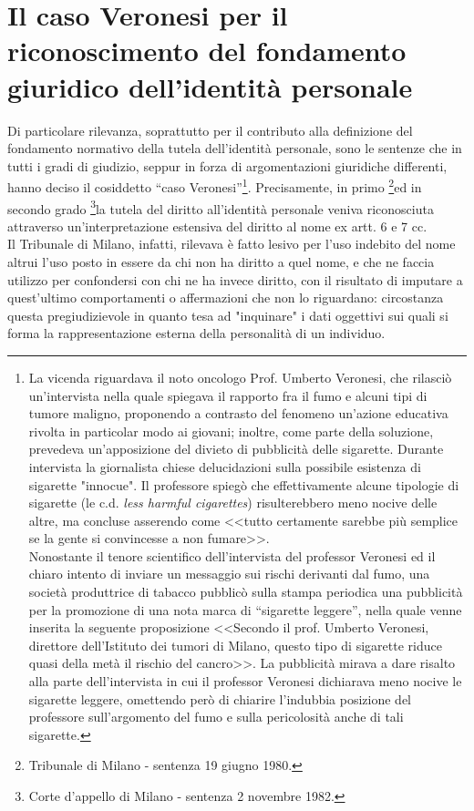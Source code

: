 \section{Il caso Veronesi per il riconoscimento del fondamento giuridico dell'identità personale}
Di particolare rilevanza, soprattutto per il contributo alla definizione del fondamento normativo della tutela dell’identità personale, sono le sentenze che in tutti i gradi di giudizio, seppur in forza di argomentazioni giuridiche differenti, hanno deciso il cosiddetto “caso Veronesi”\footnote{La vicenda riguardava il noto oncologo Prof. Umberto Veronesi, che  rilasciò un’intervista nella quale spiegava il rapporto fra il fumo e alcuni tipi di tumore maligno, proponendo a contrasto del fenomeno un'azione educativa rivolta in particolar modo ai giovani; inoltre, come parte della soluzione, prevedeva un'apposizione del divieto di pubblicità delle sigarette. Durante intervista la giornalista chiese delucidazioni sulla possibile esistenza di sigarette "innocue". Il professore spiegò che effettivamente alcune tipologie di sigarette (le c.d.\textit{ less harmful cigarettes}) risulterebbero meno nocive delle altre, ma concluse asserendo come <<tutto certamente sarebbe più semplice se la gente si convincesse a non fumare>>.\\Nonostante il tenore scientifico dell’intervista del professor Veronesi ed il chiaro intento di inviare un messaggio sui rischi derivanti dal fumo, una società produttrice di tabacco pubblicò sulla stampa periodica una pubblicità per la promozione di una nota marca di “sigarette leggere”, nella quale venne inserita la seguente proposizione <<Secondo il prof. Umberto Veronesi, direttore dell’Istituto dei tumori di Milano, questo tipo di sigarette riduce quasi della metà il rischio del cancro>>. La pubblicità mirava a dare risalto alla parte dell’intervista in cui il professor Veronesi dichiarava meno nocive le sigarette leggere, omettendo però di chiarire l'indubbia posizione del professore sull'argomento del fumo e sulla pericolosità anche di tali sigarette.}.
Precisamente, in primo \footnote{Tribunale di Milano - sentenza 19 giugno 1980.}ed in secondo grado \footnote{Corte d’appello di Milano - sentenza 2 novembre 1982.}la tutela del diritto all’identità personale veniva riconosciuta attraverso un’interpretazione estensiva del diritto al nome ex artt. 6 e 7 cc.
\\Il Tribunale di Milano, infatti, rilevava è fatto lesivo per l’uso indebito del nome altrui l’uso posto in essere da chi non ha diritto a quel nome, e che ne faccia utilizzo per confondersi con chi ne ha invece diritto, con il risultato di imputare a quest’ultimo comportamenti o affermazioni che non lo riguardano: circostanza questa pregiudizievole in quanto tesa ad "inquinare" i dati oggettivi sui quali si forma la rappresentazione esterna della personalità di un individuo. 
